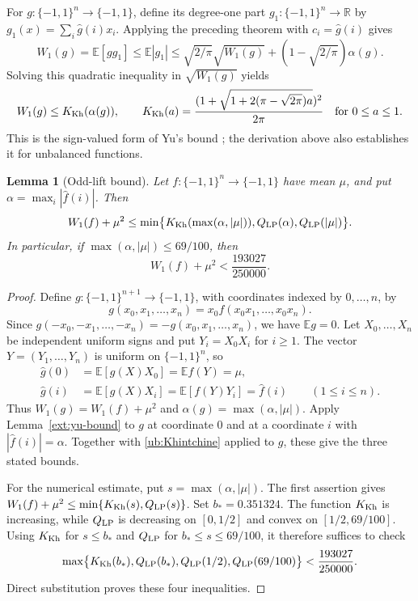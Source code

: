 \documentclass[11pt,letterpaper]{amsart}
\newcommand{\E}{\mathbb E}
\newcommand{\R}{\mathbb R}
\newcommand{\1}{\mathbf 1}
\newtheorem{lemma}[theorem]{Lemma}
\numberwithin{equation}{section}
\begin{document}
For $g:\{-1,1\}^n\to\{-1,1\}$, define its degree-one part
$g_1:\{-1,1\}^n\to\R$ by
$g_1(x)=\sum_i\widehat g(i)x_i$.
Applying the preceding theorem with $c_i=\widehat g(i)$ gives
\[
 W_1(g)=\E[gg_1]\le\E|g_1|
 \le\sqrt{2/\pi}\sqrt{W_1(g)}
      +(1-\sqrt{2/\pi})\alpha(g).
\]
Solving this quadratic inequality in $\sqrt{W_1(g)}$ yields
\begin{equation}\label{ub:Khintchine}
 W_1(g)\le K_{\rm Kh}(\alpha(g)),\qquad
 K_{\rm Kh}(a)=
 \frac{(1+\sqrt{1+2(\pi-\sqrt{2\pi})a})^2}{2\pi}
 \quad \text{for } 0\le a\le 1.
\end{equation}
This is the sign-valued form of Yu's bound
\cite[Proposition~3]{Yu2023}; the derivation above also
establishes it for unbalanced functions.

\begin{lemma}[Odd-lift bound]\label{ub:lift}
Let $f:\{-1,1\}^n\to\{-1,1\}$ have mean $\mu$, and put
$\alpha=\max_i|\widehat f(i)|$. Then
\[
 W_1(f)+\mu^2
 \le\min\bigl\{
 K_{\rm Kh}(\max(\alpha,|\mu|)),
 Q_{\rm LP}(\alpha),Q_{\rm LP}(|\mu|)
 \bigr\}.
\]
In particular, if $\max(\alpha,|\mu|)\le69/100$, then
\[
 W_1(f)+\mu^2<\frac{193027}{250000}.
\]
\end{lemma}
\begin{proof}
Define $g:\{-1,1\}^{n+1}\to\{-1,1\}$, with coordinates
indexed by $0,\ldots,n$, by
\[
 g(x_0,x_1,\ldots,x_n)
 =x_0f(x_0x_1,\ldots,x_0x_n).
\]
Since $g(-x_0,-x_1,\ldots,-x_n)=-g(x_0,x_1,\ldots,x_n)$,
we have $\E g=0$.
Let $X_0,\ldots,X_n$ be independent uniform signs and put
$Y_i=X_0X_i$ for $i\ge1$.
The vector $Y=(Y_1,\ldots,Y_n)$ is uniform on $\{-1,1\}^n$,
so
\[
 \begin{aligned}
 \widehat g(0)&=\E[g(X)X_0]=\E f(Y)=\mu,\\
 \widehat g(i)&=\E[g(X)X_i]
              =\E[f(Y)Y_i]=\widehat f(i)
              \qquad(1\le i\le n).
 \end{aligned}
\]
Thus $W_1(g)=W_1(f)+\mu^2$ and
$\alpha(g)=\max(\alpha,|\mu|)$.
Apply Lemma~\ref{ext:yu-bound} to $g$ at coordinate $0$
and at a coordinate $i$ with $|\widehat f(i)|=\alpha$.
Together with \eqref{ub:Khintchine} applied to $g$,
these give the three stated bounds.

For the numerical estimate, put $s=\max(\alpha,|\mu|)$.
The first assertion gives
$W_1(f)+\mu^2\le\min\{K_{\rm Kh}(s),Q_{\rm LP}(s)\}$.
Set $b_*=0.351324$.
The function $K_{\rm Kh}$ is increasing, while $Q_{\rm LP}$
is decreasing on $[0,1/2]$ and convex on $[1/2,69/100]$.
Using $K_{\rm Kh}$ for $s\le b_*$ and $Q_{\rm LP}$
for $b_*\le s\le69/100$, it therefore suffices to check
\[
 \max\bigl\{
 K_{\rm Kh}(b_*),Q_{\rm LP}(b_*),
 Q_{\rm LP}(1/2),Q_{\rm LP}(69/100)
 \bigr\}<\frac{193027}{250000}.
\]
Direct substitution proves these four inequalities.
\end{proof}
\end{document}
